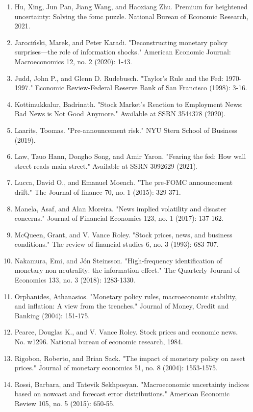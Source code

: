 \documentclass[12pt]{article}
\begin{document}
\begin{enumerate}
    \item{Hu, Xing, Jun Pan, Jiang Wang, and Haoxiang Zhu. Premium for heightened uncertainty: Solving the fomc puzzle. National Bureau of Economic Research, 2021.}
    \item{Jarociński, Marek, and Peter Karadi. "Deconstructing monetary policy surprises—the role of information shocks." American Economic Journal: Macroeconomics 12, no. 2 (2020): 1-43.}
    \item{Judd, John P., and Glenn D. Rudebusch. "Taylor's Rule and the Fed: 1970-1997." Economic Review-Federal Reserve Bank of San Francisco (1998): 3-16.}
    \item{Kottimukkalur, Badrinath. "Stock Market's Reaction to Employment News: Bad News is Not Good Anymore." Available at SSRN 3544378 (2020).}
    \item{Laarits, Toomas. "Pre-announcement risk." NYU Stern School of Business (2019).}
    \item{Law, Tzuo Hann, Dongho Song, and Amir Yaron. "Fearing the fed: How wall street reads main street." Available at SSRN 3092629 (2021).}
    \item{Lucca, David O., and Emanuel Moench. "The pre‐FOMC announcement drift." The Journal of finance 70, no. 1 (2015): 329-371.}
    \item{Manela, Asaf, and Alan Moreira. "News implied volatility and disaster concerns." Journal of Financial Economics 123, no. 1 (2017): 137-162.}
    \item{McQueen, Grant, and V. Vance Roley. "Stock prices, news, and business conditions." The review of financial studies 6, no. 3 (1993): 683-707.}
    \item{Nakamura, Emi, and Jón Steinsson. "High-frequency identification of monetary non-neutrality: the information effect." The Quarterly Journal of Economics 133, no. 3 (2018): 1283-1330.}
    \item{Orphanides, Athanasios. "Monetary policy rules, macroeconomic stability, and inflation: A view from the trenches." Journal of Money, Credit and Banking (2004): 151-175.}
    \item{Pearce, Douglas K., and V. Vance Roley. Stock prices and economic news. No. w1296. National bureau of economic research, 1984.}
    \item{Rigobon, Roberto, and Brian Sack. "The impact of monetary policy on asset prices." Journal of monetary economics 51, no. 8 (2004): 1553-1575.}
    \item{Rossi, Barbara, and Tatevik Sekhposyan. "Macroeconomic uncertainty indices based on nowcast and forecast error distributions." American Economic Review 105, no. 5 (2015): 650-55.}

\end{enumerate}
\end{document}
